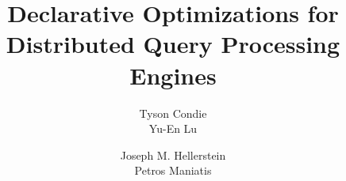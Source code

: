 \documentclass{vldb}
\begin{document}

\title{Declarative Optimizations for Distributed Query Processing Engines}


%
%
%
%


\author{
%
%
\alignauthor
Tyson Condie \\
\alignauthor
Yu-En Lu \\
\and
\alignauthor
Joseph M. Hellerstein \\
\alignauthor 
Petros Maniatis \\
}
\end{document}
